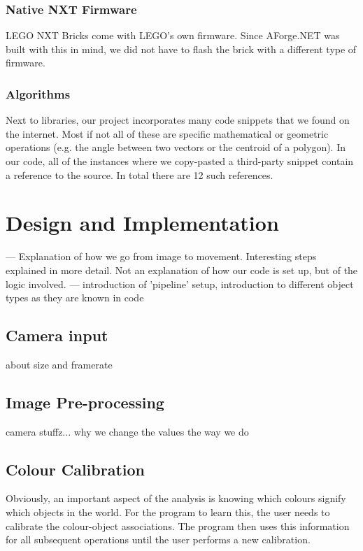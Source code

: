 \documentclass[10pt,twocolumn]{article}
\begin{document}
\subsubsection{Native NXT Firmware}
LEGO NXT Bricks come with LEGO's own firmware. Since AForge.NET was built with this in mind, we did not have to flash the brick with a different type of firmware.

\subsubsection{Algorithms}
Next to libraries, our project incorporates many code snippets that we found on the internet. Most if not all of these are specific mathematical or geometric operations (e.g. the angle between two vectors or the centroid of a polygon). In our code, all of the instances where we copy-pasted a third-party snippet contain a reference to the source. In total there are 12 such references.

\section{Design and Implementation}
--- Explanation of how we go from image to movement. Interesting steps explained in more detail. Not an explanation of how our code is set up, but of the logic involved. ---
introduction of 'pipeline' setup, introduction to different object types as they are known in code

\subsection{Camera input}
about size and framerate

\subsection{Image Pre-processing}
camera stuffz... why we change the values the way we do

\subsection{Colour Calibration}
Obviously, an important aspect of the analysis is knowing which colours signify which objects in the world. For the program to learn this, the user needs to calibrate the colour-object associations. The program then uses this information for all subsequent operations until the user performs a new calibration.
\end{document}
